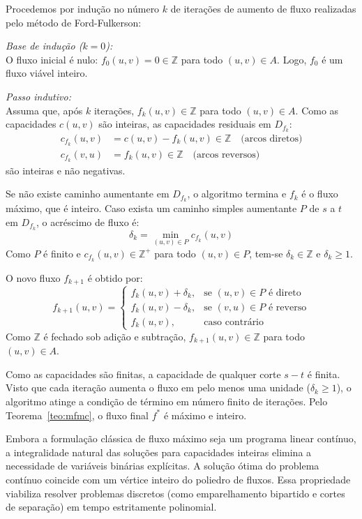\begin{demonstracao}
Procedemos por indução no número $k$ de iterações de aumento de fluxo realizadas pelo método de Ford-Fulkerson:

\medskip
\noindent \textit{Base de indução ($k = 0$):} \\
O fluxo inicial é nulo: $f_0(u,v) = 0 \in \mathbb{Z}$ para todo $(u,v) \in A$. Logo, $f_0$ é um fluxo viável inteiro.

\medskip
\noindent \textit{Passo indutivo:} \\
Assuma que, após $k$ iterações, $f_k(u,v) \in \mathbb{Z}$ para todo $(u,v) \in A$. Como as capacidades $c(u,v)$ são inteiras, as capacidades residuais em $D_{f_k}$:
\begin{align*}
    c_{f_k}(u,v) &= c(u,v) - f_k(u,v) \in \mathbb{Z} \quad \text{(arcos diretos)} \\
    c_{f_k}(v,u) &= f_k(u,v) \in \mathbb{Z} \quad \text{(arcos reversos)}
\end{align*}
são inteiras e não negativas.

Se não existe caminho aumentante em $D_{f_k}$, o algoritmo termina e $f_k$ é o fluxo máximo, que é inteiro. Caso exista um caminho simples aumentante $P$ de $s$ a $t$ em $D_{f_k}$, o acréscimo de fluxo é:
$$\delta_k = \min_{(u,v) \in P} c_{f_k}(u,v)$$
Como $P$ é finito e $c_{f_k}(u,v) \in \mathbb{Z}^+$ para todo $(u,v) \in P$, tem-se $\delta_k \in \mathbb{Z}$ e $\delta_k \ge 1$.

O novo fluxo $f_{k+1}$ é obtido por:
$$f_{k+1}(u,v) = \begin{cases} f_k(u,v) + \delta_k, & \text{se } (u,v) \in P \text{ é direto} \\ f_k(u,v) - \delta_k, & \text{se } (v,u) \in P \text{ é reverso} \\ f_k(u,v), & \text{caso contrário} \end{cases}$$
Como $\mathbb{Z}$ é fechado sob adição e subtração, $f_{k+1}(u,v) \in \mathbb{Z}$ para todo $(u,v) \in A$.

Como as capacidades são finitas, a capacidade de qualquer corte $s-t$ é finita. Visto que cada iteração aumenta o fluxo em pelo menos uma unidade ($\delta_k \ge 1$), o algoritmo atinge a condição de término em número finito de iterações. Pelo Teorema~\ref{teo:mfmc}, o fluxo final $f^*$ é máximo e inteiro.
\end{demonstracao}

 Embora a formulação clássica de fluxo máximo seja um programa linear contínuo, a integralidade natural das soluções para capacidades inteiras elimina a necessidade de variáveis binárias explícitas. A solução ótima do problema contínuo coincide com um vértice inteiro do poliedro de fluxos. Essa propriedade viabiliza resolver problemas discretos (como emparelhamento bipartido e cortes de separação) em tempo estritamente polinomial.


